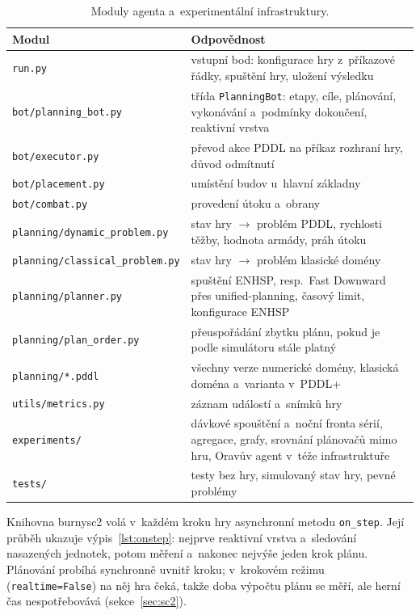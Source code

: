 \begin{table}[ht]
	\centering
	\caption{Moduly agenta a~experimentální infrastruktury.}
	\label{tab:moduly}
	\footnotesize
	\begin{tabularx}{\textwidth}{@{} l >{\raggedright\arraybackslash}X @{}}
		\toprule
		\textbf{Modul} & \textbf{Odpovědnost} \\
		\midrule
		\texttt{run.py} & vstupní bod: konfigurace hry z~příkazové řádky, spuštění hry, uložení výsledku \\
		\texttt{bot/planning\_bot.py} & třída \texttt{PlanningBot}: etapy, cíle, plánování, vykonávání a~podmínky dokončení, reaktivní vrstva \\
		\texttt{bot/executor.py} & převod akce PDDL na příkaz rozhraní hry, důvod odmítnutí \\
		\texttt{bot/placement.py} & umístění budov u~hlavní základny \\
		\texttt{bot/combat.py} & provedení útoku a~obrany \\
		\texttt{planning/dynamic\_problem.py} & stav hry $\to$ problém PDDL, rychlosti těžby, hodnota armády, práh útoku \\
		\texttt{planning/classical\_problem.py} & stav hry $\to$ problém klasické domény \\
		\texttt{planning/planner.py} & spuštění ENHSP, resp.\ Fast Downward přes unified-planning, časový limit, konfigurace ENHSP \\
		\texttt{planning/plan\_order.py} & přeuspořádání zbytku plánu, pokud je podle simulátoru stále platný \\
		\texttt{planning/*.pddl} & všechny verze numerické domény, klasická doména a~varianta v~PDDL+ \\
		\texttt{utils/metrics.py} & záznam událostí a~snímků hry \\
		\texttt{experiments/} & dávkové spouštění a~noční fronta sérií, agregace, grafy, srovnání plánovačů mimo hru, Oravův agent v~téže infrastruktuře \\
		\texttt{tests/} & testy bez hry, simulovaný stav hry, pevné problémy \\
		\bottomrule
	\end{tabularx}
\end{table}

Knihovna burnysc2 volá v~každém kroku hry asynchronní metodu \texttt{on\_step}. Její průběh ukazuje výpis~\ref{lst:onstep}: nejprve reaktivní vrstva a~sledování nasazených jednotek, potom měření a~nakonec nejvýše jeden krok plánu. Plánování probíhá synchronně uvnitř kroku; v~krokovém režimu (\texttt{realtime=False}) na něj hra čeká, takže doba výpočtu plánu se měří, ale herní čas nespotřebovává (sekce~\ref{sec:sc2}).

